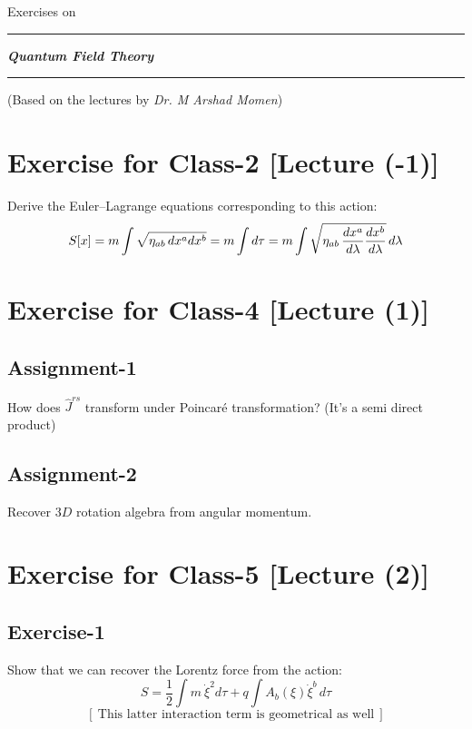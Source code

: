 \documentclass[14pt]{article} %
\begin{document}
\begin{titlepage}
    \centering
    \vspace*{3cm}
    {Exercises on \par}
    \vspace{1cm}
    \hrule
    \vspace{1cm}
    {\huge \textit{\textbf{Quantum Field Theory}} \par}
    \vspace{1cm}
    \hrule
    \vspace{1cm}
    \small
   (Based on the lectures by \textit{Dr. M Arshad Momen})
\vspace{3cm}
\end{titlepage}
\tableofcontents
\newpage
\section{Exercise for Class-2 [Lecture (-1)]}
Derive the Euler–Lagrange equations corresponding to this action:
\[
S[x] = m \int \sqrt{ \eta_{ab} \, dx^a dx^b }=m \int d \tau \\
    = m \int \sqrt{ \eta_{ab} \, \frac{dx^a}{d\lambda} \frac{dx^b}{d\lambda} } \, d\lambda
\]
\section{Exercise for Class-4 [Lecture (1)]}
\subsection{Assignment-1}
How does $\hat{J}^{rs}$ transform under Poincaré transformation? (It's a semi direct product)

\subsection{Assignment-2}
Recover $3D$ rotation algebra from angular momentum.

\section{Exercise for Class-5 [Lecture (2)]}
\subsection{Exercise-1}
Show that we can recover the Lorentz force from the action:
\[
S = \frac{1}{2} \int m~ \dot{\xi}^2 d\tau + q \int A_b(\xi) \dot{\xi}^b \, d\tau
\]
\[
\left[~\text{This latter interaction term is geometrical as well}~\right]
\]
\end{document}
